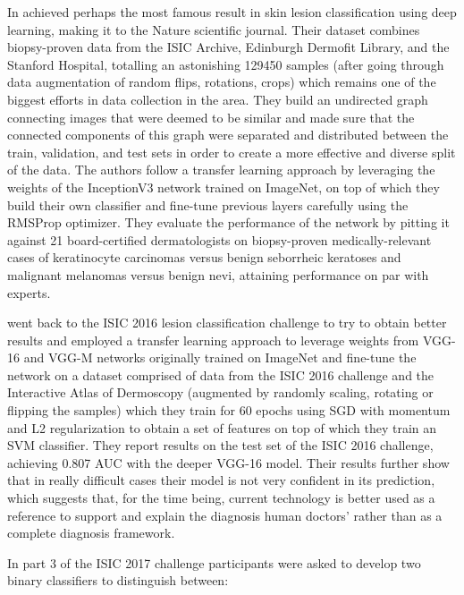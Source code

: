 In \citeyear{nature2017} \citeauthor{nature2017} \cite{nature2017} achieved perhaps the most famous result in skin lesion classification using deep learning, making it to the Nature scientific journal. Their dataset combines biopsy-proven data from the \ac{ISIC} Archive, Edinburgh Dermofit Library, and the Stanford Hospital, totalling an astonishing 129450 samples (after going through data augmentation of random flips, rotations, crops) which remains one of the biggest efforts in data collection in the area. They build an undirected graph connecting images that were deemed to be similar and made sure that the connected components of this graph were separated and distributed between the train, validation, and test sets in order to create a more effective and diverse split of the data. The authors follow a transfer learning approach by leveraging the weights of the InceptionV3 network trained on ImageNet, on top of which they build their own classifier and fine-tune previous layers carefully using the RMSProp optimizer. They evaluate the performance of the network by pitting it against 21 board-certified dermatologists on biopsy-proven medically-relevant cases of keratinocyte carcinomas versus benign seborrheic keratoses and malignant melanomas versus benign nevi, attaining performance on par with experts.

\citeauthor{menegola2017} \cite{menegola2017} went back to the \ac{ISIC} 2016 lesion classification challenge to try to obtain better results and employed a transfer learning approach to leverage weights from VGG-16 and VGG-M networks originally trained on ImageNet and fine-tune the network on a dataset comprised of data from the \ac{ISIC} 2016 challenge and the Interactive Atlas of Dermoscopy (augmented by randomly scaling, rotating or flipping the samples) which they train for 60 epochs using \ac{SGD} with momentum and L2 regularization to obtain a set of features on top of which they train an SVM classifier. They report results on the test set of the \ac{ISIC} 2016 challenge, achieving 0.807 AUC with the deeper VGG-16 model. Their results further show that in really difficult cases their model is not very confident in its prediction, which suggests that, for the time being, current technology is better used as a reference to support and explain the diagnosis human doctors' rather than as a complete diagnosis framework.

In part 3 of the \ac{ISIC} 2017 \cite{isic2017} challenge participants were asked to develop two binary classifiers to distinguish between:

